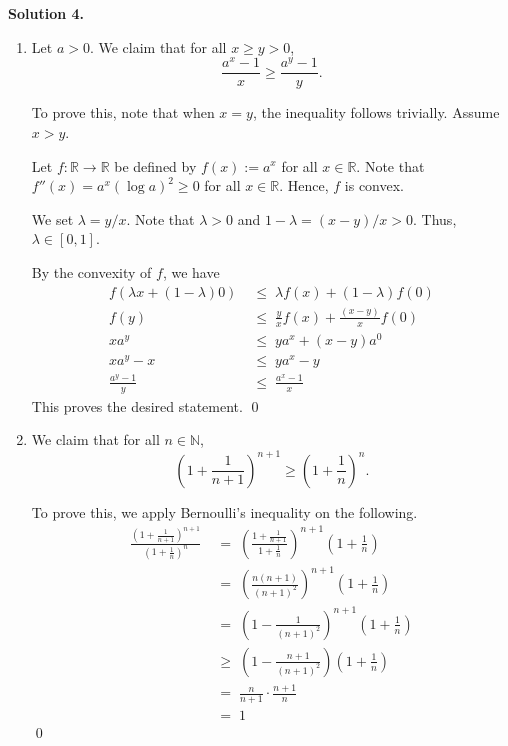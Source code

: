 \documentclass[10pt]{article}
\begin{document}
        \textbf{Solution 4.}
        \begin{enumerate}
                \item Let $a > 0$. We claim that for all $x \ge y > 0$,
                \[ \frac{a^x - 1}{x} \ge \frac{a^y - 1}{y}. \]

                To prove this, note that when $x = y$, the inequality follows trivially. Assume $x > y$.

                Let $f\colon \mathbb{R} \to \mathbb{R}$ be defined by $f(x) := a^x$ for all $x \in \mathbb{R}$.
                Note that $f''(x) = a^x (\log{a})^2 \ge 0$ for all $x \in \mathbb{R}$. Hence, $f$ is convex.

                We set $\lambda = y/x$. Note that $\lambda > 0$ and $1 - \lambda = (x - y) / x > 0$. Thus, $\lambda \in [0, 1]$.

                By the convexity of $f$, we have
                \begin{align*}
                        f(\lambda x + (1 - \lambda) 0) \;&\le\; \lambda f(x) + (1 - \lambda) f(0) \\
                        f(y) \;&\le\; \frac{y}{x}f(x) + \frac{(x - y)}{x} f(0) \\
                        x a^y \;&\le\; y a^x + (x - y) a^0 \\
                        x a^y - x \;&\le\; y a^x - y \\
                        \frac{a^y - 1}{y} \;&\le\; \frac{a^x - 1}{x}
                \end{align*}
                This proves the desired statement. \qed\\

                \item We claim that for all $n \in \mathbb{N}$,
                \[\left(1 + \frac{1}{n + 1}\right)^{n + 1} \ge \left(1 + \frac{1}{n}\right)^{n}.\]

                To prove this, we apply Bernoulli's inequality on the following.
                \begin{align*}
                \frac{\left(1 + \frac{1}{n + 1}\right)^{n+1}}{\left(1 + \frac{1}{n}\right)^n}
                        \;&=\; \left(\frac{1 + \frac{1}{n + 1}}{1 + \frac{1}{n}}\right)^{n+1}\left(1 + \frac{1}{n}\right) \\
                        \;&=\; \left(\frac{n(n+1)}{(n+1)^2}\right)^{n+1}\left(1 + \frac{1}{n}\right) \\
                        \;&=\; \left(1 - \frac{1}{(n+1)^2}\right)^{n+1}\left(1 + \frac{1}{n}\right) \\
                        \;&\ge\; \left(1 - \frac{n+1}{(n+1)^2}\right)\left(1 + \frac{1}{n}\right) \\
                        \;&=\; \frac{n}{n+1}\cdot\frac{n+1}{n} \\
                        \;&=\; 1
                \end{align*}\qed
        \end{enumerate}
\end{document}
